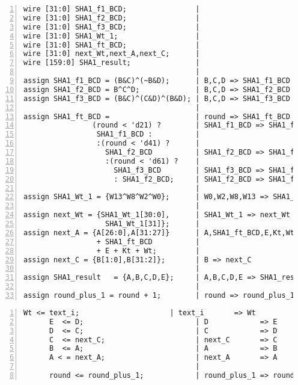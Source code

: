 \begin{Verbatim}[frame=single, numbers=left, tabsize=4, label=Combinational circuits]
wire [31:0] SHA1_f1_BCD;                |
wire [31:0] SHA1_f2_BCD;                |
wire [31:0] SHA1_f3_BCD;                |
wire [31:0] SHA1_Wt_1;                  |
wire [31:0] SHA1_ft_BCD;                |
wire [31:0] next_Wt,next_A,next_C;      |
wire [159:0] SHA1_result;               |
                                        |	
assign SHA1_f1_BCD = (B&C)^(~B&D);      | B,C,D => SHA1_f1_BCD
assign SHA1_f2_BCD = B^C^D;             | B,C,D => SHA1_f2_BCD
assign SHA1_f3_BCD = (B&C)^(C&D)^(B&D); | B,C,D => SHA1_f3_BCD
                                        |	
assign SHA1_ft_BCD =                    | round => SHA1_ft_BCD
                (round < 'd21) ?        | SHA1_f1_BCD => SHA1_ft_BCD
                 SHA1_f1_BCD :          | 
                 :(round < 'd41) ?      |
				   SHA1_f2_BCD          | SHA1_f2_BCD => SHA1_ft_BCD
                   :(round < 'd61) ?    |
                     SHA1_f3_BCD        | SHA1_f3_BCD => SHA1_ft_BCD
                     : SHA1_f2_BCD;     | SHA1_f2_BCD => SHA1_ft_BCD
                                        |
assign SHA1_Wt_1 = {W13^W8^W2^W0};      | W0,W2,W8,W13 => SHA1_Wt_1
                                        |
assign next_Wt = {SHA1_Wt_1[30:0],      | SHA1_Wt_1 => next_Wt
                   SHA1_Wt_1[31]};      |
assign next_A = {A[26:0],A[31:27]}      | A,SHA1_ft_BCD,E,Kt,Wt => next_A
                 + SHA1_ft_BCD          |
				 + E + Kt + Wt;         |
assign next_C = {B[1:0],B[31:2]};       | B => next_C
                                        |
assign SHA1_result   = {A,B,C,D,E};     | A,B,C,D,E => SHA1_result
                                        |
assign round_plus_1 = round + 1;        | round => round_plus_1
\end{Verbatim}

\begin{Verbatim}[frame=single, numbers=left, tabsize=4, label=Repeated statement in SHA stages]
	  Wt <= text_i;                     | text_i       => Wt
	  E  <= D;                          | D            => E
      D  <= C;                          | C            => D
      C  <= next_C;                     | next_C       => C 
      B  <= A;                          | A            => B
      A < = next_A;                     | next_A       => A
                                        |
      round <= round_plus_1;            | round_plus_1 => round
\end{Verbatim}

